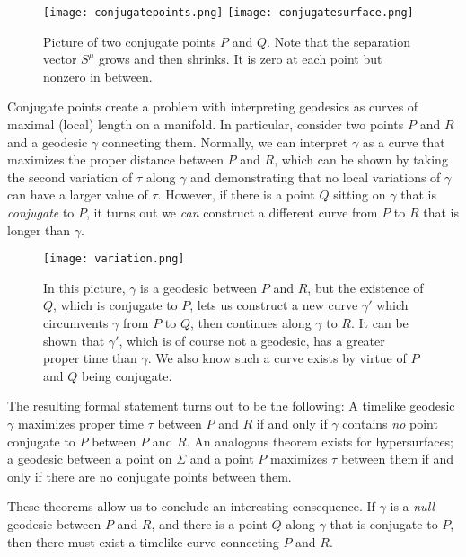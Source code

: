 \documentclass[10pt]{article}
\begin{document}
               	\begin{figure}[!h]
               	    \centering
               	    \texttt{[image: conjugatepoints.png]}
               	    \texttt{[image: conjugatesurface.png]}
               	    \caption{Picture of two conjugate points $P$ and $Q$. Note that the separation vector $S^\mu$ grows and then shrinks. It is zero at each point but nonzero in between.}
               	    \label{fig:my_label}
               	\end{figure}
               	
               	\par Conjugate points create a problem with interpreting geodesics as curves of maximal (local) length on a manifold. In particular, consider two points $P$ and $R$ and a geodesic $\gamma$ connecting them. Normally, we can interpret $\gamma$ as a curve that maximizes the proper distance between $P$ and $R$, which can be shown by taking the second variation of $\tau$ along $\gamma$ and demonstrating that no local variations of $\gamma$ can have a larger value of $\tau$. However, if there is a point $Q$ sitting on $\gamma$ that is \textit{conjugate} to $P$, it turns out we \textit{can} construct a different curve from $P$ to $R$ that is longer than $\gamma$.
               	
               	\begin{figure}[!h]
               	    \centering
               	    \texttt{[image: variation.png]}
               	    \caption{In this picture, $\gamma$ is a geodesic between $P$ and $R$, but the existence of $Q$, which is conjugate to $P$, lets us construct a new curve $\gamma'$ which circumvents $\gamma$ from $P$ to $Q$, then continues along $\gamma$ to $R$. It can be shown that $\gamma'$, which is of course not a geodesic, has a greater proper time than $\gamma$. We also know such a curve exists by virtue of $P$ and $Q$ being conjugate.}
               	    \label{fig:my_label}
               	\end{figure}
               	
               	\par The resulting formal statement turns out to be the following: A timelike geodesic $\gamma$ maximizes proper time $\tau$ between $P$ and $R$ if and only if $\gamma$ contains \textit{no} point conjugate to $P$ between $P$ and $R$. An analogous theorem exists for hypersurfaces; a geodesic between a point on $\Sigma$ and a point $P$ maximizes $\tau$ between them if and only if there are no conjugate points between them.
               	\par These theorems allow us to conclude an interesting consequence. If $\gamma$ is a \textit{null} geodesic between $P$ and $R$, and there is a point $Q$ along $\gamma$ that is conjugate to $P$, then there must exist a timelike curve connecting $P$ and $R$.
               	
\end{document}
